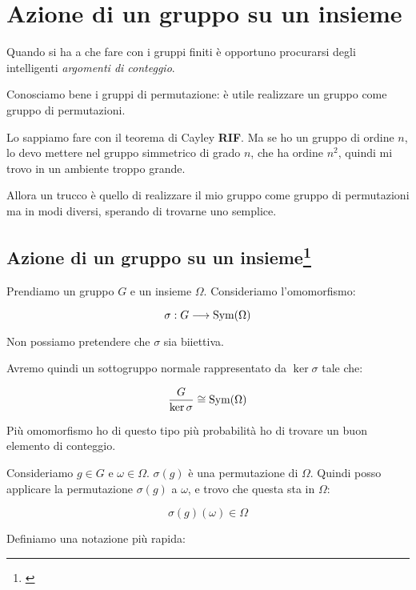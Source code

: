 \chapter{Azione di un gruppo su un insieme}

Quando si ha a che fare con i gruppi finiti è opportuno procurarsi degli intelligenti \emph{argomenti di conteggio}.

Conosciamo bene i gruppi di permutazione: è utile realizzare un gruppo come gruppo di permutazioni.

Lo sappiamo fare con il teorema di Cayley \textbf{RIF}. Ma se ho un gruppo di ordine $n$, lo devo mettere nel gruppo simmetrico di grado $n$, che ha ordine $n^2$, quindi mi trovo in un ambiente troppo grande.

Allora un trucco è quello di realizzare il mio gruppo come gruppo di permutazioni ma in modi diversi, sperando di trovarne uno semplice.

\section[Azione di un gruppo su un insieme]{Azione di un gruppo su un insieme\footnote{\cite[8 novembre 2021]{lucchini}}}

Prendiamo un gruppo $G$ e un insieme $\Omega$.
Consideriamo l'omomorfismo:

\begin{equation}
	\sigma: G \longrightarrow \operatorname{Sym}(\Omega)
\end{equation}

Non possiamo pretendere che $\sigma$ sia biiettiva.

Avremo quindi un sottogruppo normale rappresentato da $\ker \sigma$ tale che:

\begin{equation}
	\dfrac{G}{\ker \sigma} \cong \operatorname{Sym}(\Omega)
\end{equation} 

Più omomorfismo ho di questo tipo più probabilità ho di trovare un buon elemento di conteggio.

Consideriamo $g \in G$ e $\omega \in \Omega$. $\sigma(g)$ è una permutazione di $\Omega$. Quindi posso applicare la permutazione $\sigma(g)$ a $\omega$, e trovo che questa sta in $\Omega$:

\begin{equation}
	\sigma(g)(\omega) \in \Omega
\end{equation}

Definiamo una notazione più rapida:

